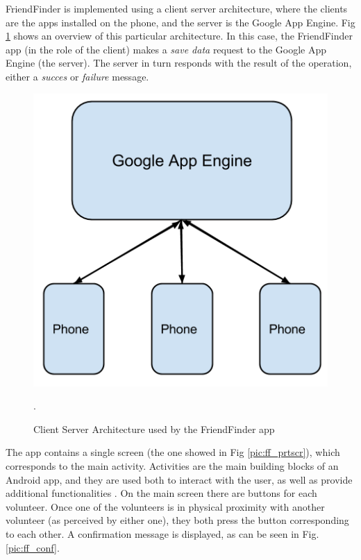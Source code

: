 FriendFinder is implemented using a client server architecture, where the clients are the apps installed on the phone, and the server is the Google App Engine. Fig \ref{pic:clientserver} shows an overview of this particular architecture. In this case, the FriendFinder app (in the role of the client) makes a \textit{save data} request to the Google App Engine (the server). The server in turn responds with the result of the operation, either a \textit{succes} or \textit{failure} message.  

\begin{figure}[h]
	\begin{center}
		\includegraphics[scale=0.5]{figures/SC_Arch.png}
	\end{center}
	
	\caption{Client Server Architecture used by the FriendFinder app}.
	\label{pic:clientserver}

\end{figure} 

The app contains a single screen (the one showed in Fig \ref{pic:ff_prtscr}), which corresponds to the main activity. Activities are the main building blocks of an Android app, and they are used both to interact with the user, as well as provide additional functionalities \cite{activity}. On the main screen there are buttons for each volunteer. Once one of the volunteers is in physical proximity with another volunteer (as perceived by either one), they both press the button corresponding to each other. A confirmation message is displayed, as can be seen in Fig. \ref{pic:ff_conf}.

